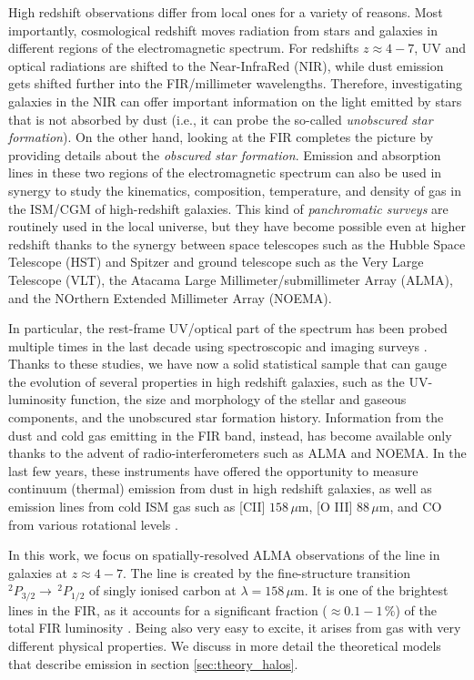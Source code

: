 High redshift observations differ from local ones for a variety of reasons. Most importantly, cosmological redshift moves radiation from stars and galaxies in different regions of the electromagnetic spectrum. For redshifts $z\approx 4-7$, UV and optical radiations are shifted to the Near-InfraRed (NIR), while dust emission gets shifted further into the FIR/millimeter wavelengths. Therefore, investigating galaxies in the NIR can offer important information on the light emitted by stars that is not absorbed by dust (i.e., it can probe the so-called \textit{unobscured star formation}). On the other hand, looking at the FIR completes the picture by providing details about the \textit{obscured star formation}. Emission and absorption lines in these two regions of the electromagnetic spectrum can also be used in synergy to study the kinematics, composition, temperature, and density of gas in the ISM/CGM of high-redshift galaxies. This kind of \textit{panchromatic surveys} are routinely used in the local universe, but they have become possible even at higher redshift thanks to the synergy between space telescopes such as the Hubble Space Telescope (HST) and Spitzer and ground telescope such as the Very Large Telescope (VLT), the Atacama Large Millimeter/submillimeter Array (ALMA), and the NOrthern Extended Millimeter Array (NOEMA). 

In particular, the rest-frame UV/optical part of the spectrum has been probed multiple times in the last decade using spectroscopic and imaging surveys \citep[e.g.,][]{oesch2009structure,Shibuya:2015qfa, bouwens2017z, kawamata2018size}. Thanks to these studies, we have now a solid statistical sample that can gauge the evolution of several properties in high redshift galaxies, such as the UV-luminosity function, the size and morphology of the stellar and gaseous components, and the unobscured star formation history. Information from the dust and cold gas emitting in the FIR band, instead, has become available only thanks to the advent of radio-interferometers such as ALMA and NOEMA. In the last few years, these instruments have offered the opportunity to measure continuum (thermal) emission from dust in high redshift galaxies, as well as emission lines from cold ISM gas such as [CII] $158 \,\mu\mathrm{m}$, [O III] $88 \,\mu\mathrm{m}$, and CO from various rotational levels \citep{maiolino2015,capak2015,pentericci2016,knudsen2016b, matthee2017, carniani2018b, Hashimoto2018,gallerani:2018}.

In this work, we focus on spatially-resolved ALMA observations of the \CII line in galaxies at $z\approx 4-7$. The \CII line is created by the fine-structure transition $^2P_{3/2} \rightarrow
\,^2P_{1/2}$ of singly ionised carbon at $\lambda = 158\,\mu\mathrm{m}$. It is one of the brightest lines in the FIR, as it accounts for a significant fraction ($\approx 0.1-1\,\%$) of the total FIR luminosity \citep{gong2012}. Being also very easy to excite, it arises from gas with very different physical properties. We discuss in more detail the theoretical models that describe \CII emission in section \ref{sec:theory_halos}. 

